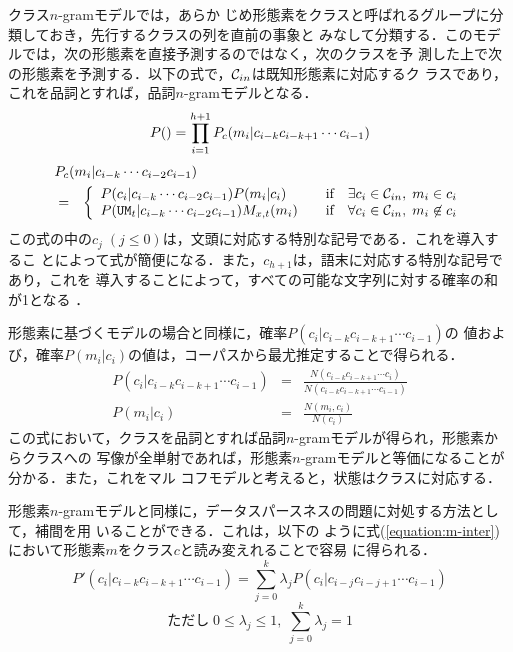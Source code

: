 クラス$n$-gramモデル\cite{Class-Based.n-gram.Models.of.Natural.Language}では，あらか
じめ形態素をクラスと呼ばれるグループに分類しておき，先行するクラスの列を直前の事象と
みなして分類する．このモデルでは，次の形態素を直接予測するのではなく，次のクラスを予
測した上で次の形態素を予測する．以下の式で，${\cal C}_{in}$は既知形態素に対応するク
ラスであり，これを品詞とすれば，品詞$n$-gramモデルとなる．
\begin{equation}
  \label{equation:class_n-gram1}
  P(\Bdma{m}) = \prod_{i=1}^{h+1}P_{c}(m_{i}|c_{i-k}c_{i-k+1}\cdots c_{i-1})
\end{equation}
\begin{eqnarray}
  \label{equation:class_n-gram2}
  \lefteqn{P_{c}(m_{i}|c_{i-k} \cdots c_{i-2}c_{i-1})} \nonumber \\
  & = & \left\{\begin{array}{lccl}
          P(c_{i}|c_{i-k} \cdots c_{i-2}c_{i-1})P(m_{i}|c_{i})
            & & \mbox{if} & \exists c_{i} \in {\cal C}_{in},\; m_{i} \in c_{i} \\
          P({\tt UM}_{t}|c_{i-k} \cdots c_{i-2}c_{i-1})M_{x,t}(m_{i})
            & & \mbox{if} & \forall c_{i} \in {\cal C}_{in},\; m_{i} \not \in c_{i} \\
        \end{array}\right.
\end{eqnarray}
この式の中の$c_{j}\;(j \leq 0)$は，文頭に対応する特別な記号である．これを導入するこ
とによって式が簡便になる．また，$c_{h+1}$は，語末に対応する特別な記号であり，これを
導入することによって，すべての可能な文字列に対する確率の和が1となる
\cite{Syntactic.Methods.in.Pattern.Recognition}．

形態素に基づくモデルの場合と同様に，確率$P(c_{i}|c_{i-k}c_{i-k+1} \cdots c_{i-1})$の
値および，確率$P(m_{i}|c_{i})$の値は，コーパスから最尤推定することで得られる．
\begin{eqnarray*}
  P(c_{i}|c_{i-k}c_{i-k+1} \cdots c_{i-1}) & = &
        \frac{N(c_{i-k}c_{i-k+1} \cdots c_{i})}{N(c_{i-k}c_{i-k+1} \cdots c_{i-1})} \\
                            P(m_{i}|c_{i}) & = & \frac{N(m_{i},c_{i})}{N(c_{i})}
\end{eqnarray*}
この式において，クラスを品詞とすれば品詞$n$-gramモデルが得られ，形態素からクラスへの
写像が全単射であれば，形態素$n$-gramモデルと等価になることが分かる．また，これをマル
コフモデルと考えると，状態はクラスに対応する．

形態素$n$-gramモデルと同様に，データスパースネスの問題に対処する方法として，補間を用
いることができる\cite{Class-Based.n-gram.Models.of.Natural.Language}．これは，以下の
ように式(\ref{equation:m-inter})において形態素$m$をクラス$c$と読み変えれることで容易
に得られる．
\begin{equation}
  \label{equation:c-inter}
  P'(c_{i}|c_{i-k}c_{i-k+1} \cdots c_{i-1})
  = \sum_{j=0}^{k}\lambda_{j}P(c_{i}|c_{i-j}c_{i-j+1} \cdots c_{i-1})
\end{equation}
\begin{displaymath}
  ただし \; 0 \leq \lambda_{j} \leq 1, \; \sum_{j=0}^{k}\lambda_{j} = 1
\end{displaymath}



